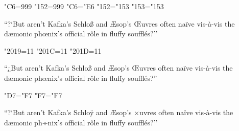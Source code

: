 \sfcode"C6=999
\sfcode"152=999
\lccode"C6="E6 %
\lccode"152="153 %
\lccode"153="153

``?`But aren't Kafka's Schloß and Æsop's Œuvres
often naïve vis-à-vis the dæmonic phœnix's official rôle
in fluffy soufflés?''

\catcode"2019=11
\catcode"201C=11
\catcode"201D=11

“¿But aren’t Kafka’s Schloß and Æsop’s Œuvres
often naïve vis-à-vis the dæmonic phœnix’s official rôle
in fluffy soufflés?”

{
\eclmr
\lccode"D7="F7 %
\lccode"F7="F7

``?`But aren't Kafka's Schlo^^ff and ^^c6sop's ^^d7uvres
often na^^efve vis-^^e0-vis the d^^e6monic ph^^f7nix's official r^^f4le
in fluffy souffl^^e9s?''
}

\bye
